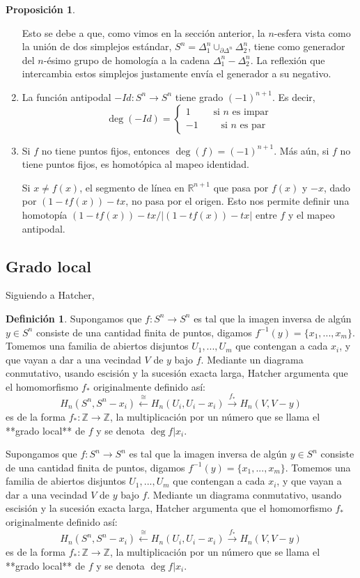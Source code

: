 \documentclass[spanish]{book}
\theoremstyle{definition}
\newtheorem*{defn}{Definición}
\newtheorem*{prop}{Proposición}
\newcommand{\R}{\mathbb{R}}
\newcommand{\Z}{\mathbb{Z}}
\begin{document}
\begin{prop}
\begin{enumerate}
			Esto se debe a que, como vimos en la sección anterior, la $n$-esfera vista como la unión de dos simplejos estándar, $S^n=\Delta_1^n\cup_{\partial\Delta^n}\Delta_2^n$, tiene como generador del $n$-ésimo grupo de homología a la cadena $\Delta_1^n-\Delta_2^n$. La reflexión que intercambia estos simplejos justamente envía el generador a su negativo.
			\item La función antipodal $-Id:S^n\to S^n$ tiene grado $(-1)^{n+1}$. Es decir,
			\[\deg (-Id)=\begin{cases}1\qquad\text{ si }n\text{ es impar}\\
				-1\qquad\text{ si }n\text{ es par}\end{cases}\]
			\item Si $f$ no tiene puntos fijos, entonces $\deg (f)=(-1)^{n+1}$. Más aún, si $f$ no tiene puntos fijos, es homotópica al mapeo identidad.
			
			Si $x\neq f(x)$, el segmento de línea en $\R^{n+1}$ que pasa por $f(x)$ y $-x$, dado por $(1-tf(x))-tx$, no pasa por el origen. Esto nos permite definir una homotopía $(1-tf(x))-tx/|(1-tf(x))-tx|$ entre $f$ y el mapeo antipodal. 
		\end{enumerate}
	\end{prop}
\subsection{Grado local}\label{subsec:grloc}
	Siguiendo a Hatcher,
	\begin{defn}
		Supongamos que $f:S^n\to S^n$ es tal que la imagen inversa de algún $y\in S^n$ consiste de una cantidad finita de puntos, digamos $f^{-1}(y)=\{x_1,...,x_m\}$. Tomemos una familia de abiertos disjuntos $U_1,...,U_m$ que contengan a cada $x_i$, y que vayan a dar a una vecindad $V$ de $y$ bajo $f$. Mediante un diagrama conmutativo, usando escisión y la sucesión exacta larga, Hatcher argumenta que el homomorfismo $f_*$ originalmente definido así:
		\[H_n(S^n,S^n-x_i)\xleftarrow{\cong}H_n(U_i,U_i-x_i)\xrightarrow{f_*}H_n(V,V-y)\]
		es de la forma $f_*:\Z \to \Z$, la multiplicación por un número que se llama el **grado local** de $f$ y se denota $\deg f|x_i$.
	\end{defn}
	Supongamos que $f:S^n\to S^n$ es tal que la imagen inversa de algún $y\in S^n$ consiste de una cantidad finita de puntos, digamos $f^{-1}(y)=\{x_1,...,x_m\}$. Tomemos una familia de abiertos disjuntos $U_1,...,U_m$ que contengan a cada $x_i$, y que vayan a dar a una vecindad $V$ de $y$ bajo $f$. Mediante un diagrama conmutativo, usando escisión y la sucesión exacta larga, Hatcher argumenta que el homomorfismo $f_*$ originalmente definido así:
	\[H_n(S^n,S^n-x_i)\xleftarrow{\cong}H_n(U_i,U_i-x_i)\xrightarrow{f_*}H_n(V,V-y)\]
	es de la forma $f_*:\Z \to \Z$, la multiplicación por un número que se llama el **grado local** de $f$ y se denota $\deg f|x_i$.
	
\end{document}
